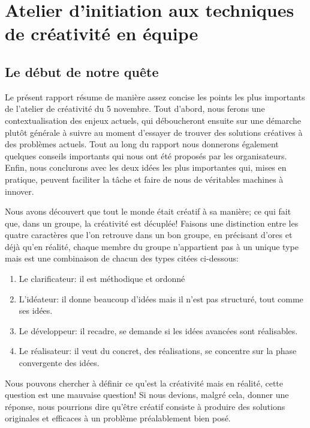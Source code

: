 \section{Atelier d'initiation aux techniques de créativité en équipe}


\subsection{Le début de notre quête}

Le présent rapport résume de manière assez concise les points les plus importants de l'atelier de créativité du 5 novembre. Tout d'abord, nous ferons une contextualisation des enjeux actuels, qui déboucheront ensuite sur une démarche plutôt générale à suivre au moment d'essayer de trouver des solutions créatives à des problèmes actuels. Tout au long du rapport nous donnerons également quelques conseils importants qui nous ont été proposés par les organisateurs. Enfin, nous conclurons avec les deux idées les plus importantes qui, mises en pratique, peuvent faciliter la tâche et faire de nous de véritables machines à innover.

Nous avons découvert que tout le monde était créatif à sa manière; ce qui fait que, dans un groupe, la créativité est décuplée! Faisons une distinction entre les quatre caractères que l'on retrouve dans un bon groupe, en précisant d'ores et déjà qu'en réalité, chaque membre du groupe n’appartient pas à un unique type mais est une combinaison de chacun des types citées ci-dessous:

\begin{enumerate}
\item Le clarificateur: il est méthodique et ordonné
\item L'idéateur: il donne beaucoup d’idées mais il n'est pas structuré, tout comme ses idées.
\item Le développeur: il recadre, se demande si les idées avancées sont réalisables.
\item Le réalisateur: il veut du concret, des réalisations, se concentre sur la phase convergente des idées.
\end{enumerate}

Nous pouvons chercher à définir ce qu’est la créativité mais en réalité, cette question est une mauvaise question! Si nous devions, malgré cela, donner une réponse, nous pourrions dire qu’être créatif consiste à produire des solutions originales et efficaces à un problème préalablement bien posé. 

